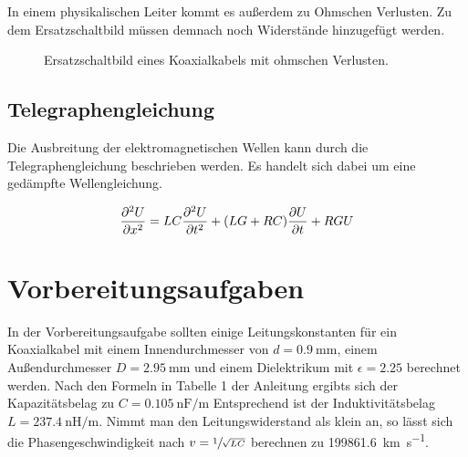 In einem physikalischen Leiter kommt es außerdem zu Ohmschen Verlusten. Zu dem Ersatzschaltbild müssen demnach noch Widerstände hinzugefügt werden.
\begin{figure}
  \centering
  
  \caption{Ersatzschaltbild eines Koaxialkabels mit ohmschen Verlusten.}
  \label{fig:circuit_ohm}
\end{figure}


\subsection{Telegraphengleichung}
Die Ausbreitung der elektromagnetischen Wellen kann durch die Telegraphengleichung beschrieben werden.
Es handelt sich dabei um eine gedämpfte Wellengleichung.

\begin{equation}
  \label{eq:telegraph}
  \frac{\partial^2 U}{\partial x^2} = LC  \frac{\mathinner{\partial^2 U}}{\mathinner{\partial t^2} } + (LG + RC) \frac{\mathinner{\partial U}}{\mathinner{\partial t} } + RGU
\end{equation}

\section{Vorbereitungsaufgaben}
In der Vorbereitungsaufgabe sollten einige Leitungskonstanten für ein Koaxialkabel mit einem Innendurchmesser von $d = \SI{0.9}{\mm}$,
einem Außendurchmesser $D = \SI{2.95}{\mm}$  und einem Dielektrikum mit $\epsilon = 2.25$ berechnet werden.
Nach den Formeln in Tabelle 1 der Anleitung\cite{anleitung} ergibts sich der Kapazitätsbelag zu $C = \SI{0.105}{\nano\farad \per \meter}$
Entsprechend ist der Induktivitätsbelag $ L = \SI{237.4}{\nano \henry \per \meter}$.
Nimmt man den Leitungswiderstand als klein an, so lässt sich die Phasengeschwindigkeit nach $v = \sfrac{1}{\sqrt{L C}}$ berechnen zu
\SI{199861.6}{\kilo\meter\per\second}.
